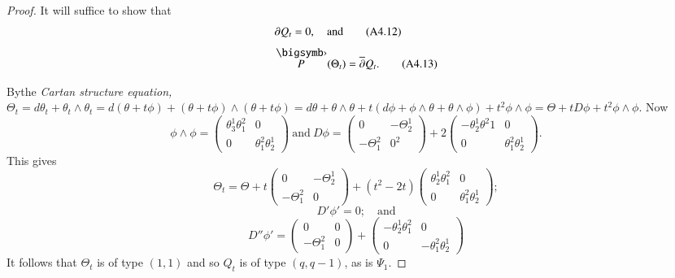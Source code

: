 \begin{proof}
It will suffice to show that
\begin{align*}
& \partial Q_{t}=0,\quad\text{and}\tag{A4.12}\label{art08-sec4-eqA4.12}\\[3pt]
& \overdot{P}(\Theta_{t})=\overline{\partial}Q_{t}.\tag{A4.13}\label{art08-sec4-eqA4.13}
\end{align*}

By\pageoriginale the {\em Cartan structure equation,} $\Theta_{t}=d\theta_{t}+\theta_{t}\wedge \theta_{t}=d(\theta+t\phi)+(\theta+t\phi)\wedge (\theta+t\phi)=d\theta+\theta\wedge\theta+t(d\phi+\phi\wedge \theta+\theta\wedge\phi)+t^{2}\phi\wedge \phi=\Theta+tD\phi+t^{2}\phi\wedge\phi$. Now
$$
\phi\wedge \phi=\left(\begin{matrix} \theta^{1}_{3}\theta^{2}_{1} & 0 \\ 0 & \theta^{2}_{1}\theta^{1}_{2}\end{matrix}\right)~\text{and}~ D\phi=\left(\begin{matrix} 0 & -\Theta^{1}_{2}\\ -\Theta^{2}_{1} & 0^{2}\end{matrix}\right)+2\left(\begin{matrix} -\theta^{1}_{2}\theta^{2}{1} & 0\\ 0 & \theta^{2}_{1}\theta^{1}_{2}\end{matrix}\right).
$$
This gives
\begin{equation*}
\Theta_{t}=\Theta+t\left(\begin{matrix} 0 & -\Theta^{1}_{2}\\ -\Theta^{2}_{1} & 0\end{matrix}\right)+(t^{2}-2t)\left(\begin{matrix} \theta^{1}_{2}\theta^{2}_{1} & 0\\ 0 & \theta^{2}_{1}\theta^{1}_{2}\end{matrix}\right);\tag{A4.14}\label{art08-sec4-eqA4.14}
\end{equation*}
\begin{equation*}
D'\phi'=0;\quad\text{and}\tag{A4.15}\label{art08-sec4-eqA4.15}
\end{equation*}
\begin{equation*}
D''\phi'=\left(\begin{matrix} 0 & 0 \\ -\Theta^{2}_{1} & 0\end{matrix}\right)+\left(\begin{matrix}-\theta^{1}_{2}\theta^{2}_{1} & 0\\ 0 & -\theta^{2}_{1}\theta^{1}_{2}\end{matrix}\right)\tag{A4.16}\label{art08-sec4-eqA4.16}
\end{equation*}
It follows that $\Theta_{t}$ is of type $(1,1)$ and so $Q_{t}$ is of type $(q,q-1)$, as is $\Psi_{1}$.


\end{proof}
